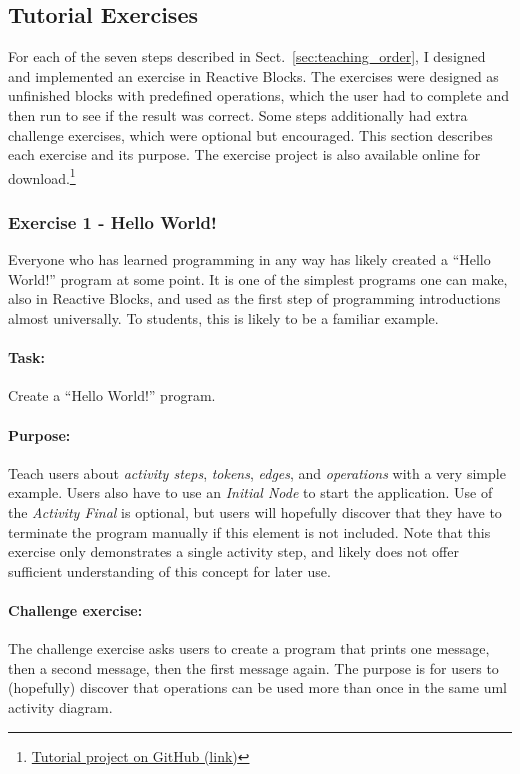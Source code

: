 \subsection{Tutorial Exercises}
\label{sec:tutorial_exercises}
For each of the seven steps described in Sect.~\ref{sec:teaching_order}, I designed and implemented an exercise in Reactive Blocks. The exercises were designed as unfinished blocks with predefined operations, which the user had to complete and then run to see if the result was correct. Some steps additionally had extra challenge exercises, which were optional but encouraged. This section describes each exercise and its purpose. The exercise project is also available online for download.\footnote{\href{https://github.com/Desarc/reactive-blocks-tutorials/tree/master/no.ntnu.item.tutorials}{Tutorial project on GitHub (link)}}

\subsubsection{Exercise 1 - Hello World!}
Everyone who has learned programming in any way has likely created a ``Hello World!'' program at some point. It is one of the simplest programs one can make, also in Reactive Blocks, and used as the first step of programming introductions almost universally. To students, this is likely to be a familiar example.

\paragraph{Task:} Create a ``Hello World!'' program.

\paragraph{Purpose:} Teach users about \emph{activity steps}, \emph{tokens}, \emph{edges}, and \emph{operations} with a very simple example. Users also have to use an \emph{Initial Node} to start the application. Use of the \emph{Activity Final} is optional, but users will hopefully discover that they have to terminate the program manually if this element is not included. Note that this exercise only demonstrates a single activity step, and likely does not offer sufficient understanding of this concept for later use.

\paragraph{Challenge exercise:} The challenge exercise asks users to create a program that prints one message, then a second message, then the first message again. The purpose is for users to (hopefully) discover that operations can be used more than once in the same \gls{uml} activity diagram.

